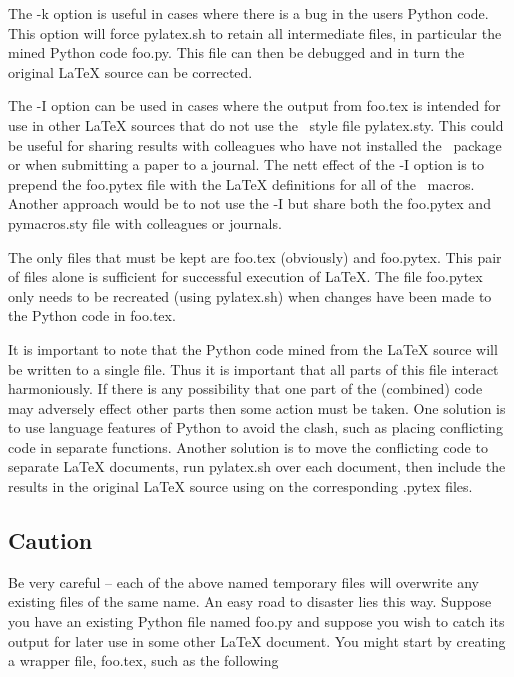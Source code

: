 \documentclass[12pt]{article}
\begin{document}
The {\tts -k} option is useful in cases where there is a bug in the users Python
code. This option will force {\tts pylatex.sh} to retain all intermediate files,
in particular the mined Python code {\tts foo.py}. This file can then be debugged
and in turn the original LaTeX source can be corrected.

The {\tts -I} option can be used in cases where the output from {\tts foo.tex} is
intended for use in other LaTeX sources that do not use the \pyLaTeX\ style file
{\tts pylatex.sty}. This could be useful for sharing results with colleagues who
have not installed the \pyLaTeX\ package or when submitting a paper to a journal.
The nett effect of the {\tts -I} option is to prepend the {\tts foo.pytex} file
with the LaTeX definitions for all of the \pyLaTeX\ macros. Another approach would
be to not use the {\tts -I} but share both the {\tts foo.pytex} and {\tts
pymacros.sty} file with colleagues or journals.

The only files that must be kept are {\tts foo.tex} (obviously) and {\tts
foo.pytex}. This pair of files alone is sufficient for successful execution of
LaTeX. The file {\tts foo.pytex} only needs to be recreated (using {\tts
pylatex.sh}) when changes have been made to the Python code in {\tts foo.tex}.

It is important to note that the Python code mined from the LaTeX source will be
written to a single file. Thus it is important that all parts of this file
interact harmoniously. If there is any possibility that one part of the (combined)
code may adversely effect other parts then some action must be taken. One solution
is to use language features of Python to avoid the clash, such as placing
conflicting code in separate functions. Another solution is to move the
conflicting code to separate LaTeX documents, run {\tts pylatex.sh} over each
document, then include the results in the original LaTeX source using
{\tts\verb||} on the corresponding {\tts .pytex} files.

\subsection{Caution}

Be very careful -- each of the above named temporary files will overwrite any
existing files of the same name. An easy road to disaster lies this way. Suppose
you have an existing Python file named {\tts foo.py} and suppose you wish to catch
its output for later use in some other LaTeX document. You might start by creating
a wrapper file, {\tts foo.tex}, such as the following
\end{document}
